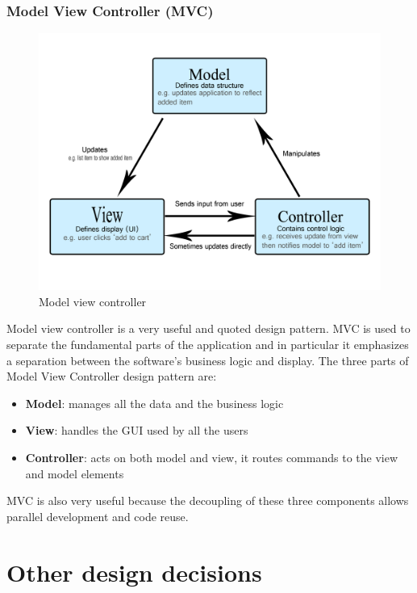             \subsubsection*{Model View Controller (MVC)}
            \begin{figure}[H]
                \includegraphics[scale=0.9]{dd/resources/images/MVC.png}
                \caption{Model view controller}        
            \end{figure}
            Model view controller is a very useful and quoted design pattern.
            MVC is used to separate the fundamental parts of the application and
            in particular it  emphasizes a separation between the software’s
            business logic and display.
            The three parts of Model View Controller design pattern are:
            \begin{itemize}
                \item \textbf{Model}: manages all the data and the business logic
                \item \textbf{View}: handles the GUI used by all the users
                \item \textbf{Controller}: acts on both model and view, it
                routes commands to the view and model elements  
            \end{itemize}    
            MVC is also very useful because the decoupling of these three
            components allows parallel development and code reuse.
    \section{Other design decisions}
